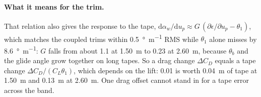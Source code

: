 \documentclass[11pt,a4paper]{article}
\begin{document}
\paragraph{What it means for the trim.}
That relation also gives the response to the tape, $\mathrm d\alpha_w/\mathrm du_p\approx
G\,(\partial\epsilon/\partial u_p-\theta_1)$, which matches the coupled trims within
\SI{0.5}{\degree\per\metre} RMS while $\theta_1$ alone misses by \SI{8.6}{\degree\per\metre}: $G$ falls from about 1.1 at
\SI{1.50}{\metre} to 0.23 at \SI{2.60}{\metre}, because $\theta_b$ and the glide angle grow together on
long tapes. So a drag change $\Delta C_D$ equals a tape change $\Delta C_D/(C_L\theta_1)$, which
depends on the lift: 0.01 is worth \SI{0.04}{\metre} of tape at \SI{1.50}{\metre} and \SI{0.13}{\metre} at
\SI{2.60}{\metre}. One drag offset cannot stand in for a tape error across the band.

\end{document}
